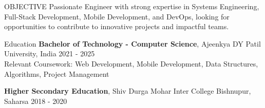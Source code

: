 \documentclass{style}
\begin{document}

\begin{rSection}{OBJECTIVE}
{Passionate Engineer with strong expertise in Systems Engineering, Full-Stack Development, Mobile Development, and DevOps, looking for opportunities to contribute to innovative projects and impactful teams.}
\end{rSection}


\begin{rSection}{Education}
{\bf Bachelor of Technology - Computer Science}, Ajeenkya DY Patil University, India \hfill {2021 - 2025}\\
Relevant Coursework: Web Development, Mobile Development, Data Structures, Algorithms, Project Management

\vspace{0.5em} %

{\bf Higher Secondary Education}, Shiv Durga Mohar Inter College Bishnupur, Saharsa \hfill {2018 - 2020}
\end{rSection}


\end{document}
